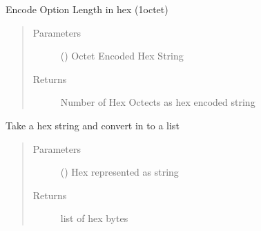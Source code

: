 \documentclass[letterpaper,10pt,english]{sphinxmanual}
\begin{document}
\begin{fulllineitems}

\begin{fulllineitems}
\label{\detokenize{dhcp_decode-class:bloxone.dhcp_decode.hex_length}}
\sphinxAtStartPar
Encode Option Length in hex (1\sphinxhyphen{}octet)
\begin{quote}\begin{description}
\item[{Parameters}] \leavevmode
\sphinxAtStartPar
{} () \textendash{} Octet Encoded Hex String

\item[{Returns}] \leavevmode
\sphinxAtStartPar
Number of Hex Octects as hex encoded string

\end{description}\end{quote}

\end{fulllineitems}


\begin{fulllineitems}
\label{\detokenize{dhcp_decode-class:bloxone.dhcp_decode.hex_string_to_list}}
\sphinxAtStartPar
Take a hex string and convert in to a list
\begin{quote}\begin{description}
\item[{Parameters}] \leavevmode
\sphinxAtStartPar
{} () \textendash{} Hex represented as string

\item[{Returns}] \leavevmode
\sphinxAtStartPar
list of hex bytes

\end{description}\end{quote}

\end{fulllineitems}



\end{fulllineitems}
\end{document}
